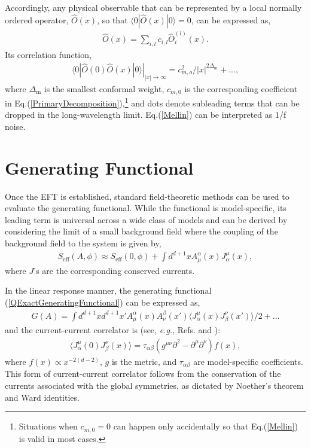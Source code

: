 \documentclass[final,5p,10pt,times,twocolumn,year]{elsarticle}
\begin{document}
Accordingly, any physical observable that can be represented by a local normally ordered operator, $\hat O(x)$, so that $\langle0| \hat O(x) |0\rangle = 0$, can be expressed as,
\begin{eqnarray}
    \hat O(x) = \sum\nolimits_{i,l} c_{i,l}\hat O_i^{(l)}(x).\label{PrimaryDecomposition}
\end{eqnarray}
Its correlation function,
\begin{eqnarray}
   \left.\langle 0 | \hat O(0) \hat O(x)|0\rangle\right|_{|x|\to\infty} = c_{m,o}^2/|x|^{2\Delta_{\text{m}}} + ..., \label{Mellin}
\end{eqnarray}
where $\Delta_{\text{m}}$ is the smallest conformal weight, $c_{m,0}$ is the corresponding coefficient in Eq.(\ref{PrimaryDecomposition}),\footnote{Situations when $c_{m,0}=0$ can happen only accidentally so that Eq.(\ref{Mellin}) is valid in most cases.} and dots denote subleading terms that can be dropped in the long-wavelength limit. Eq.(\ref{Mellin}) can be interpreted as 1/f noise.

\section{Generating Functional}
\label{Generating_functional}

Once the EFT is established, standard field-theoretic methods can be used to evaluate the generating functional. While the functional is model-specific, its leading term is universal across a wide class of models and can be derived by considering the limit of a small background field where the coupling of the background field to the system is given by, 
\begin{eqnarray}
    S_\text{eff}(A,\phi) \approx S_\text{eff}(0,\phi) + \int d^{d+1}x A^\alpha_\mu(x) J^\mu_\alpha(x),\label{Perturbation}
\end{eqnarray}
where $J$'s are the corresponding conserved currents.

In the linear response manner, the generating functional (\ref{QExactGeneratingFunctional}) can be expressed as,
\begin{eqnarray}
    G({A}) = \int d^{d+1}x d^{d+1}x' A^\alpha_\mu(x) A^\beta_\nu(x') \langle  J^\mu_\alpha(x) J^\nu_\beta(x') \rangle/2 + ...\label{WGaussianTerm}
\end{eqnarray}
and the current-current correlator is (see, \emph{e.g.}, Refs.\cite{RevModPhys.91.015002} and \cite{GaugeFieldsInAdSCFT}): 
\begin{eqnarray}
\langle  J^\mu_\alpha(0) J^\nu_\beta(x) \rangle = \tau_{\alpha\beta} (g^{\mu\nu}\partial^2 - \partial^\mu\partial^\nu) f(x),\label{CurrentCurrent}
\end{eqnarray}
where $f(x)\propto x^{-2(d-2)}$, $g$ is the metric, and $\tau_{\alpha\beta}$ are model-specific coefficients. This form of current-current correlator follows from the conservation of the currents associated with the global symmetries, as dictated by Noether's theorem and Ward identities.
\end{document}
